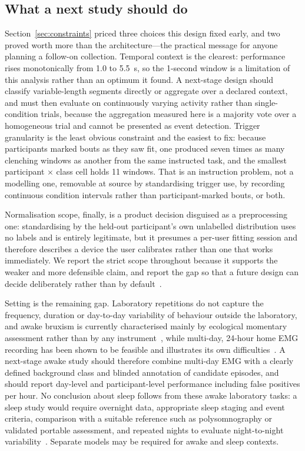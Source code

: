 \documentclass[pdflatex,sn-nature,iicol]{sn-jnl}
\begin{document}
\subsection{What a next study should do}

Section~\ref{sec:constraints} priced three choices this design fixed early, and two proved worth more than the architecture---the practical message for anyone planning a follow-on collection. Temporal context is the clearest: performance rises monotonically from 1.0 to 5.5~s, so the 1-second window is a limitation of this analysis rather than an optimum it found. A next-stage design should classify variable-length segments directly or aggregate over a declared context, and must then evaluate on continuously varying activity rather than single-condition trials, because the aggregation measured here is a majority vote over a homogeneous trial and cannot be presented as event detection. Trigger granularity is the least obvious constraint and the easiest to fix: because participants marked bouts as they saw fit, one produced seven times as many clenching windows as another from the same instructed task, and the smallest participant $\times$ class cell holds 11 windows. That is an instruction problem, not a modelling one, removable at source by standardising trigger use, by recording continuous condition intervals rather than participant-marked bouts, or both.

Normalisation scope, finally, is a product decision disguised as a preprocessing one: standardising by the held-out participant's own unlabelled distribution uses no labels and is entirely legitimate, but it presumes a per-user fitting session and therefore describes a device the user calibrates rather than one that works immediately. We report the strict scope throughout because it supports the weaker and more defensible claim, and report the gap so that a future design can decide deliberately rather than by default~\cite{besomi2020consensus}.

Setting is the remaining gap. Laboratory repetitions do not capture the frequency, duration or day-to-day variability of behaviour outside the laboratory, and awake bruxism is currently characterised mainly by ecological momentary assessment rather than by any instrument~\cite{bracci2018frequency}, while multi-day, 24-hour home EMG recording has been shown to be feasible and illustrates its own difficulties~\cite{colonna2023electromyographic,lobbezoo2020consensus}. A next-stage awake study should therefore combine multi-day EMG with a clearly defined background class and blinded annotation of candidate episodes, and should report day-level and participant-level performance including false positives per hour. No conclusion about sleep follows from these awake laboratory tasks: a sleep study would require overnight data, appropriate sleep staging and event criteria, comparison with a suitable reference such as polysomnography or validated portable assessment, and repeated nights to evaluate night-to-night variability~\cite{lavigne1996sleep,casett2017validity,cidverdejo2024instrumental}. Separate models may be required for awake and sleep contexts.
\end{document}
